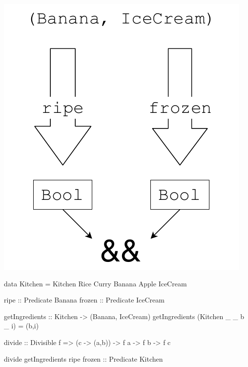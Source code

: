 \documentclass[UKenglish,usenames,dvipsnames,svgnames,table,aspectratio=169,mathserif]{beamer}
\newcommand{\nl}{\vspace{\baselineskip}}
\newcommand{\pnl}{\pause \nl}
\begin{document}
\begin{frame}
\centering
\includegraphics[scale=0.6]{banana1.pdf}
\end{frame}


\begin{frame}[fragile]
\begin{haskellcode}
data Kitchen = Kitchen Rice Curry Banana Apple IceCream
\end{haskellcode}

\pnl
\begin{haskellcode}
ripe :: Predicate Banana
frozen :: Predicate IceCream
\end{haskellcode}

\pnl
\begin{haskellcode}
getIngredients :: Kitchen -> (Banana, IceCream)
getIngredients (Kitchen _ _ b _ i) = (b,i)
\end{haskellcode}

\pnl
\begin{haskellcode}
divide :: Divisible f => (c -> (a,b)) -> f a -> f b -> f c
\end{haskellcode}

\pnl
\begin{haskellcode}
divide getIngredients ripe frozen :: Predicate Kitchen
\end{haskellcode}
\end{frame}
\end{document}
